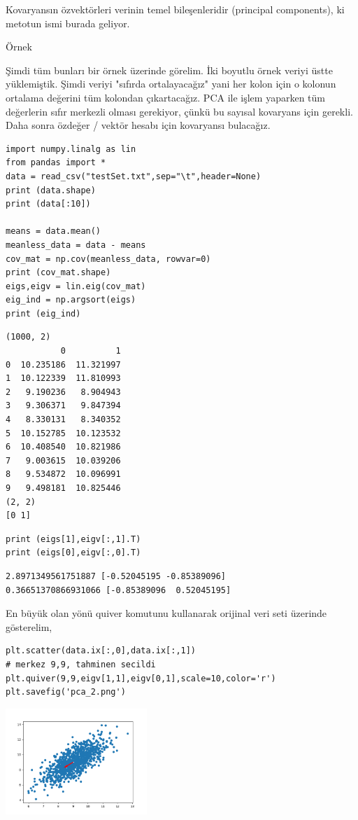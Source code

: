 \documentclass[12pt,fleqn]{article}\usepackage{../../common}
\begin{document}
Kovaryansın özvektörleri verinin temel bileşenleridir (principal
components), ki metotun ismi burada geliyor.

Örnek

Şimdi tüm bunları bir örnek üzerinde görelim. İki boyutlu örnek veriyi
üstte yüklemiştik. Şimdi veriyi "sıfırda ortalayacağız" yani her kolon için
o kolonun ortalama değerini tüm kolondan çıkartacağız. PCA ile işlem
yaparken tüm değerlerin sıfır merkezli olması gerekiyor, çünkü bu sayısal
kovaryans için gerekli. Daha sonra özdeğer / vektör hesabı için kovaryansı
bulacağız.

\begin{verbatim}
import numpy.linalg as lin
from pandas import *
data = read_csv("testSet.txt",sep="\t",header=None)
print (data.shape)
print (data[:10])

means = data.mean()
meanless_data = data - means
cov_mat = np.cov(meanless_data, rowvar=0)
print (cov_mat.shape)
eigs,eigv = lin.eig(cov_mat)
eig_ind = np.argsort(eigs)
print (eig_ind)
\end{verbatim}

\begin{verbatim}
(1000, 2)
           0          1
0  10.235186  11.321997
1  10.122339  11.810993
2   9.190236   8.904943
3   9.306371   9.847394
4   8.330131   8.340352
5  10.152785  10.123532
6  10.408540  10.821986
7   9.003615  10.039206
8   9.534872  10.096991
9   9.498181  10.825446
(2, 2)
[0 1]
\end{verbatim}

\begin{verbatim}
print (eigs[1],eigv[:,1].T)
print (eigs[0],eigv[:,0].T)
\end{verbatim}

\begin{verbatim}
2.8971349561751887 [-0.52045195 -0.85389096]
0.36651370866931066 [-0.85389096  0.52045195]
\end{verbatim}

En büyük olan yönü quiver komutunu kullanarak orijinal veri seti
üzerinde gösterelim,

\begin{verbatim}
plt.scatter(data.ix[:,0],data.ix[:,1]) 
# merkez 9,9, tahminen secildi
plt.quiver(9,9,eigv[1,1],eigv[0,1],scale=10,color='r') 
plt.savefig('pca_2.png')
\end{verbatim}

\includegraphics[height=4cm]{pca_2.png}
\end{document}
